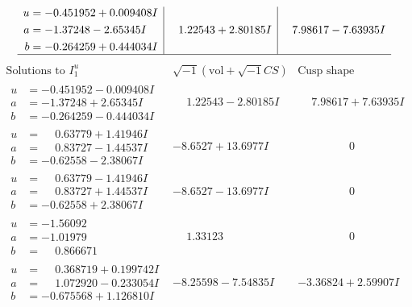 \documentclass[1p]{elsarticle_modified}
\theoremstyle{definition}
\newcommand{\I}{\sqrt{-1}}
\begin{document}
$$\begin{array}{c|c|c}
\begin{aligned}
u &= -0.451952 + 0.009408 I \\
a &= -1.37248 - 2.65345 I \\
b &= -0.264259 + 0.444034 I\end{aligned}
 & \phantom{-}1.22543 + 2.80185 I & \phantom{-}7.98617 - 7.63935 I\\
 \hline 
 \end{array}$$\newpage$$\begin{array}{c|c|c}  
\text{Solutions to }I^u_{1}& \I (\text{vol} + \sqrt{-1}CS) & \text{Cusp shape}\\
 \hline 
\begin{aligned}
u &= -0.451952 - 0.009408 I \\
a &= -1.37248 + 2.65345 I \\
b &= -0.264259 - 0.444034 I\end{aligned}
 & \phantom{-}1.22543 - 2.80185 I & \phantom{-}7.98617 + 7.63935 I \\ \hline\begin{aligned}
u &= \phantom{-}0.63779 + 1.41946 I \\
a &= \phantom{-}0.83727 - 1.44537 I \\
b &= -0.62558 - 2.38067 I\end{aligned}
 & -8.6527 + 13.6977 I & \phantom{-0.000000 } 0 \\ \hline\begin{aligned}
u &= \phantom{-}0.63779 - 1.41946 I \\
a &= \phantom{-}0.83727 + 1.44537 I \\
b &= -0.62558 + 2.38067 I\end{aligned}
 & -8.6527 - 13.6977 I & \phantom{-0.000000 } 0 \\ \hline\begin{aligned}
u &= -1.56092\phantom{ +0.000000I} \\
a &= -1.01979\phantom{ +0.000000I} \\
b &= \phantom{-}0.866671\phantom{ +0.000000I}\end{aligned}
 & \phantom{-}1.33123\phantom{ +0.000000I} & \phantom{-0.000000 } 0 \\ \hline\begin{aligned}
u &= \phantom{-}0.368719 + 0.199742 I \\
a &= \phantom{-}1.072920 - 0.233054 I \\
b &= -0.675568 + 1.126810 I\end{aligned}
 & -8.25598 - 7.54835 I & -3.36824 + 2.59907 I \\ \hline\begin{aligned}

\end{aligned}
\end{array}$$
\end{document}
